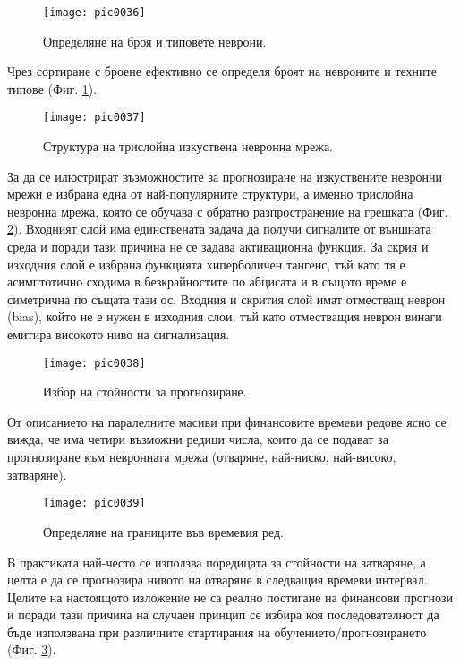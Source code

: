 \begin{figure}[h]
  \centering
  \texttt{[image: pic0036]}
  \caption{Определяне на броя и типовете неврони.}
\label{fig:pic0036}
\end{figure}
\FloatBarrier

Чрез сортиране с броене ефективно се определя броят на невроните и техните типове (Фиг. \ref{fig:pic0036}).

\begin{figure}[h]
  \centering
  \texttt{[image: pic0037]}
  \caption{Структура на трислойна изкуствена невронна мрежа.}
\label{fig:pic0037}
\end{figure}
\FloatBarrier

За да се илюстрират възможностите за прогнозиране на изкуствените невронни мрежи е избрана една от най-популярните структури, а именно трислойна невронна мрежа, която се обучава с обратно разпространение на грешката (Фиг. \ref{fig:pic0037}). Входният слой има единствената задача да получи сигналите от външната среда и поради тази причина не се задава активационна функция. За скрия и изходния слой е избрана функцията хиперболичен тангенс, тъй като тя е асимптотично сходима в безкрайностите по абцисата и в същото време е симетрична по същата тази ос. Входния и скрития слой имат отместващ неврон (bias), който не е нужен в изходния слои, тъй като отместващия неврон винаги емитира високото ниво на сигнализация.

\begin{figure}[h]
  \centering
  \texttt{[image: pic0038]}
  \caption{Избор на стойности за прогнозиране.}
\label{fig:pic0038}
\end{figure}
\FloatBarrier

От описанието на паралелните масиви при финансовите времеви редове ясно се вижда, че има четири възможни редици числа, които да се подават за прогнозиране към невронната мрежа (отваряне, най-ниско, най-високо, затваряне). 

\begin{figure}[h]
  \centering
  \texttt{[image: pic0039]}
  \caption{Определяне на границите във времевия ред.}
\label{fig:pic0039}
\end{figure}
\FloatBarrier

В практиката най-често се използва поредицата за стойности на затваряне, а целта е да се прогнозира нивото на отваряне в следващия времеви интервал. Целите на настоящото изложение не са реално постигане на финансови прогнози и поради тази причина на случаен принцип се избира коя последователност да бъде използвана при различните стартирания на обучението/прогнозирането (Фиг. \ref{fig:pic0038}).

